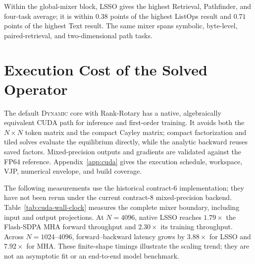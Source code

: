 \documentclass[10pt]{article}
\begin{document}
Within the global-mixer block, LSSO gives the highest Retrieval, Pathfinder,
and four-task average; it is within $0.38$ points of the highest ListOps result
and $0.71$ points of the highest Text result.  The same mixer spans symbolic,
byte-level, paired-retrieval, and two-dimensional path tasks.

\section{Execution Cost of the Solved Operator}
\label{sec:cuda-implementation}

The default \textsc{Dynamic} core with Rank-Rotary has a native,
algebraically equivalent CUDA path for inference and first-order training.  It
avoids both the $N\times N$ token matrix and the compact Cayley matrix; compact
factorization and tiled solves evaluate the equilibrium directly, while the
analytic backward reuses saved factors.  Mixed-precision outputs and gradients
are validated against the FP64 reference.  Appendix~\ref{app:cuda} gives the
execution schedule, workspace, VJP, numerical envelope, and build coverage.

The following measurements use the historical contract-6 implementation;
they have not been rerun under the current contract-8 mixed-precision backend.
Table~\ref{tab:cuda-wall-clock} measures the complete mixer boundary, including
input and output projections.  At $N=4096$, native LSSO reaches $1.79\times$
the Flash-SDPA MHA forward throughput and $2.30\times$ its training throughput.
Across $N=1024$--$4096$, forward--backward latency grows by $3.88\times$ for
LSSO and $7.92\times$ for MHA.  These finite-shape timings illustrate
the scaling trend; they are not an asymptotic fit or an end-to-end model benchmark.
\end{document}
